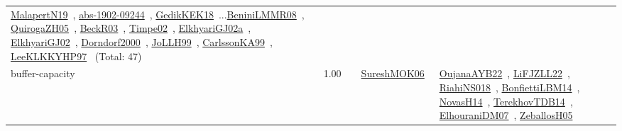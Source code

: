 {\begin{longtable}{p{3cm}r>{\raggedright\arraybackslash}p{6cm}>{\raggedright\arraybackslash}p{6cm}>{\raggedright\arraybackslash}p{8cm}}
\href{../works/MalapertN19.pdf}{MalapertN19}~\cite{MalapertN19}, \href{../works/abs-1902-09244.pdf}{abs-1902-09244}~\cite{abs-1902-09244}, \href{../works/GedikKEK18.pdf}{GedikKEK18}~\cite{GedikKEK18}...\href{../works/BeniniLMMR08.pdf}{BeniniLMMR08}~\cite{BeniniLMMR08}, \href{../works/QuirogaZH05.pdf}{QuirogaZH05}~\cite{QuirogaZH05}, \href{../works/BeckR03.pdf}{BeckR03}~\cite{BeckR03}, \href{../works/Timpe02.pdf}{Timpe02}~\cite{Timpe02}, \href{../works/ElkhyariGJ02a.pdf}{ElkhyariGJ02a}~\cite{ElkhyariGJ02a}, \href{../works/ElkhyariGJ02.pdf}{ElkhyariGJ02}~\cite{ElkhyariGJ02}, \href{../works/Dorndorf2000.pdf}{Dorndorf2000}~\cite{Dorndorf2000}, \href{../works/JoLLH99.pdf}{JoLLH99}~\cite{JoLLH99}, \href{../works/CarlssonKA99.pdf}{CarlssonKA99}~\cite{CarlssonKA99}, \href{../works/LeeKLKKYHP97.pdf}{LeeKLKKYHP97}~\cite{LeeKLKKYHP97} (Total: 47)\\
\index{buffer-capacity}\index{Concepts!buffer-capacity}buffer-capacity &  1.00 &  & \href{../works/SureshMOK06.pdf}{SureshMOK06}~\cite{SureshMOK06} & \href{../works/OujanaAYB22.pdf}{OujanaAYB22}~\cite{OujanaAYB22}, \href{../works/LiFJZLL22.pdf}{LiFJZLL22}~\cite{LiFJZLL22}, \href{../works/RiahiNS018.pdf}{RiahiNS018}~\cite{RiahiNS018}, \href{../works/BonfiettiLBM14.pdf}{BonfiettiLBM14}~\cite{BonfiettiLBM14}, \href{../works/NovasH14.pdf}{NovasH14}~\cite{NovasH14}, \href{../works/TerekhovTDB14.pdf}{TerekhovTDB14}~\cite{TerekhovTDB14}, \href{../works/ElhouraniDM07.pdf}{ElhouraniDM07}~\cite{ElhouraniDM07}, \href{../works/ZeballosH05.pdf}{ZeballosH05}~\cite{ZeballosH05}\\

\end{longtable}}
